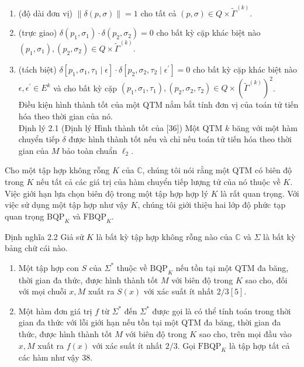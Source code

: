 \documentclass[10pt]{article}
\begin{document}
\begin{enumerate}
  \item (độ dài đơn vị) $\|\delta(p, \sigma)\|=1$ cho tất cả $(p, \sigma) \in Q \times \tilde{\Gamma}^{(k)}$.
  \item (trực giao) $\delta\left(p_{1}, \sigma_{1}\right) \cdot \delta\left(p_{2}, \sigma_{2}\right)=0$ cho bất kỳ cặp khác biệt nào $\left(p_{1}, \sigma_{1}\right),\left(p_{2}, \sigma_{2}\right) \in Q \times \tilde{\Gamma}^{(k)}$.
  \item (tách biệt) $\delta\left[p_{1}, \sigma_{1}, \tau_{1} \mid \epsilon\right] \cdot \delta\left[p_{2}, \sigma_{2}, \tau_{2} \mid \epsilon^{\prime}\right]=0$ cho bất kỳ cặp khác biệt nào $\epsilon, \epsilon^{\prime} \in E^{k}$ và cho bất kỳ cặp $\left(p_{1}, \sigma_{1}, \tau_{1}\right),\left(p_{2}, \sigma_{2}, \tau_{2}\right) \in Q \times\left(\tilde{\Gamma}^{(k)}\right)^{2}$.\\
Điều kiện hình thành tốt của một QTM nắm bắt tính đơn vị của toán tử tiến hóa theo thời gian của nó.\\[0pt]
Định lý 2.1 (Định lý Hình thành tốt của [36]) Một QTM $k$ băng với một hàm chuyển tiếp $\delta$ được hình thành tốt nếu và chỉ nếu toán tử tiến hóa theo thời gian của $M$ bảo toàn chuẩn $\ell_{2}$.
\end{enumerate}

Cho một tập hợp không rỗng $K$ của $\mathbb{C}$, chúng tôi nói rằng một QTM có biên độ trong $K$ nếu tất cả các giá trị của hàm chuyển tiếp lượng tử của nó thuộc về $K$. Việc giới hạn lựa chọn biên độ trong một tập hợp hợp lý $K$ là rất quan trọng. Với việc sử dụng một tập hợp như vậy $K$, chúng tôi giới thiệu hai lớp độ phức tạp quan trọng $\mathrm{BQP}_{K}$ và $\mathrm{FBQP}_{K}$.

Định nghĩa 2.2 Giả sử $K$ là bất kỳ tập hợp không rỗng nào của $\mathbb{C}$ và $\Sigma$ là bất kỳ bảng chữ cái nào.

\begin{enumerate}
  \item Một tập hợp con $S$ của $\Sigma^{*}$ thuộc về $\mathrm{BQP}_{K}$ nếu tồn tại một QTM đa băng, thời gian đa thức, được hình thành tốt $M$ với biên độ trong $K$ sao cho, đối với mọi chuỗi $x, M$ xuất ra $S(x)$ với xác suất ít nhất $2 / 3[5]$.
  \item Một hàm đơn giá trị $f$ từ $\Sigma^{*}$ đến $\Sigma^{*}$ được gọi là có thể tính toán trong thời gian đa thức với lỗi giới hạn nếu tồn tại một QTM đa băng, thời gian đa thức, được hình thành tốt $M$ với biên độ trong $K$ sao cho, trên mọi đầu vào $x, M$ xuất ra $f(x)$ với xác suất ít nhất $2 / 3$. Gọi $\mathrm{FBQP}_{K}$ là tập hợp tất cả các hàm như vậy 38.
\end{enumerate}
\end{document}
